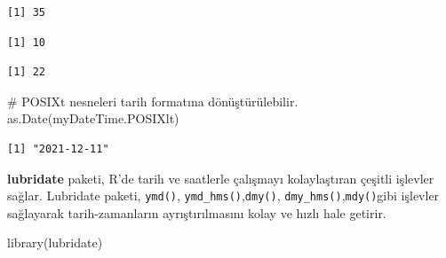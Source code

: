 \documentclass[
  letterpaper,
  DIV=11,
  numbers=noendperiod]{scrreprt}
\newenvironment{Shaded}{\begin{snugshade}}{\end{snugshade}}
\newcommand{\CommentTok}[1]{\textcolor[rgb]{0.37,0.37,0.37}{#1}}
\newcommand{\FunctionTok}[1]{\textcolor[rgb]{0.28,0.35,0.67}{#1}}
\newcommand{\NormalTok}[1]{\textcolor[rgb]{0.00,0.23,0.31}{#1}}
\newcommand{\OtherTok}[1]{\textcolor[rgb]{0.00,0.23,0.31}{#1}}
\newcommand{\SpecialCharTok}[1]{\textcolor[rgb]{0.37,0.37,0.37}{#1}}
\begin{document}
\begin{Shaded}
\end{Shaded}

\begin{verbatim}
[1] 35
\end{verbatim}

\begin{Shaded}
\end{Shaded}

\begin{verbatim}
[1] 10
\end{verbatim}

\begin{Shaded}
\end{Shaded}

\begin{verbatim}
[1] 22
\end{verbatim}

\begin{Shaded}
\begin{Highlighting}[]
\CommentTok{\# POSIXt nesneleri tarih formatına dönüştürülebilir.}
\FunctionTok{as.Date}\NormalTok{(myDateTime.POSIXlt)}
\end{Highlighting}
\end{Shaded}

\begin{verbatim}
[1] "2021-12-11"
\end{verbatim}

\textbf{lubridate} paketi, R'de tarih ve saatlerle çalışmayı
kolaylaştıran çeşitli işlevler sağlar. Lubridate paketi, \texttt{ymd()},
\texttt{ymd\_hms()},\texttt{dmy()},
\texttt{dmy\_hms()},\texttt{mdy()}gibi işlevler sağlayarak
tarih-zamanların ayrıştırılmasını kolay ve hızlı hale getirir.

\begin{Shaded}
\begin{Highlighting}[]
\FunctionTok{library}\NormalTok{(lubridate)}
\end{Highlighting}
\end{Shaded}
\end{document}
